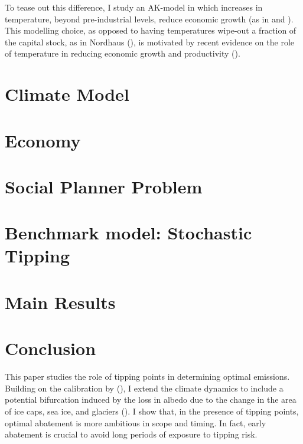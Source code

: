 \documentclass[american, abstract=off]{scrartcl}
\newcommand{\citein}[1]{\citeauthor{#1} (\citeyear{#1})}
\begin{document}
To tease out this difference, I study an AK-model in which increases in temperature, beyond pre-industrial levels, reduce economic growth (as in \cite{pindyck_economic_2013} and \cite{hambel_optimal_2021}). This modelling choice, as opposed to having temperatures wipe-out a fraction of the capital stock, as in Nordhaus (\citeyear{nordhaus_estimates_2014,nordhaus_question_2008,nordhaus_revisiting_2017}), is motivated by recent evidence on the role of temperature in reducing economic growth and productivity (\cite{burke_global_2015, dietz_growth_2019}).


\section{Climate Model}



\section{Economy}




\section{Social Planner Problem}



\section{Benchmark model: Stochastic Tipping}



\section{Main Results}



\section{Conclusion}

This paper studies the role of tipping points in determining optimal emissions. Building on the calibration by \citein{hambel_optimal_2021}, I extend the climate dynamics to include a potential bifurcation induced by the loss in albedo due to the change in the area of ice caps, sea ice, and glaciers (\cite{ashwin_tipping_2012,ashwin_extreme_2020}). I show that, in the presence of tipping points, optimal abatement is more ambitious in scope and timing. In fact, early abatement is crucial to avoid long periods of exposure to tipping risk.
\end{document}
